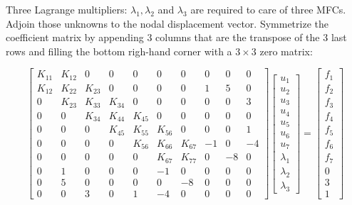 \documentclass[10pt,b5paper,titlepage]{book}
\begin{document}
Three Lagrange multipliers: $ \lambda_1, \lambda_2 $ and $ \lambda_3 $ are
required to care of three MFCs. Adjoin those unknowns to the nodal displacement
vector. Symmetrize the coefficient matrix by appending 3 columns that are the
transpose of the 3 last rows and filling the bottom righ-hand corner with
a $ 3 \times 3 $ zero matrix:

\begin{equation}
    \begin{bmatrix}
        K_{11} & K_{12} & 0 & 0 & 0 & 0 & 0 & 0 & 0 & 0 \\
        K_{12} & K_{22} & K_{23} & 0 & 0 & 0 & 0 & 1 & 5 & 0 \\
        0 & K_{23} & K_{33} & K_{34} & 0 & 0 & 0 & 0 & 0 & 3 \\
        0 & 0 & K_{34} & K_{44} & K_{45} & 0 & 0 & 0 & 0 & 0 \\
        0 & 0 & 0 & K_{45} & K_{55} & K_{56} & 0 & 0 & 0 & 1 \\
        0 & 0 & 0 & 0 & K_{56} & K_{66} & K_{67} & -1 & 0 & -4 \\
        0 & 0 & 0 & 0 & 0 & K_{67} & K_{77} & 0 & -8 & 0 \\
        0 & 1 & 0 & 0 & 0 & -1 & 0 & 0 & 0 & 0 \\
        0 & 5 & 0 & 0 & 0 & 0 & -8 & 0 & 0 & 0 \\
        0 & 0 & 3 & 0 & 1 & -4 & 0 & 0 & 0 & 0
    \end{bmatrix}
    \begin{bmatrix}
        u_1 \\
        u_2 \\
        u_3 \\
        u_4 \\
        u_5 \\
        u_6 \\
        u_7 \\
        \lambda_1 \\
        \lambda_2 \\
        \lambda_3
    \end{bmatrix}
    = \begin{bmatrix}
        f_1 \\
        f_2 \\
        f_3 \\
        f_4 \\
        f_5 \\
        f_6 \\
        f_7 \\
        0 \\
        3 \\
        1
    \end{bmatrix}
\end{equation}
\end{document}
